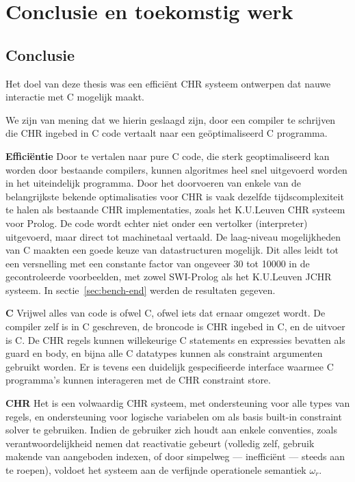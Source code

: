 \chapter{Conclusie en toekomstig werk} \label{chap:concl}

\section{Conclusie} \label{sec:concl}

Het doel van deze thesis was een effici\"ent CHR systeem ontwerpen dat nauwe interactie met C mogelijk maakt.

We zijn van mening dat we hierin geslaagd zijn, door een compiler te schrijven die CHR ingebed in C code vertaalt naar een ge\"optimaliseerd C programma.

{\bf Effici\"entie} Door te vertalen naar pure C code, die sterk geoptimaliseerd kan worden door bestaande compilers, kunnen algoritmes heel snel uitgevoerd worden in het uiteindelijk programma. Door het doorvoeren van enkele van de belangrijkste bekende optimalisaties voor CHR is vaak dezelfde tijdscomplexiteit te halen als bestaande CHR implementaties, zoals het K.U.Leuven CHR systeem voor Prolog. De code wordt echter niet onder een vertolker (interpreter) uitgevoerd, maar direct tot machinetaal vertaald. De laag-niveau mogelijkheden van C maakten een goede keuze van datastructuren mogelijk. Dit alles leidt tot een versnelling met een constante factor van ongeveer 30 tot 10000 in de gecontroleerde voorbeelden, met zowel SWI-Prolog als het K.U.Leuven JCHR systeem. In sectie~\ref{sec:bench-end} werden de resultaten gegeven.

{\bf C} Vrijwel alles van code is ofwel C, ofwel iets dat ernaar omgezet wordt. De compiler zelf is in C geschreven, de broncode is CHR ingebed in C, en de uitvoer is C. De CHR regels kunnen willekeurige C statements en expressies bevatten als guard en body, en bijna alle C datatypes kunnen als constraint argumenten gebruikt worden. Er is tevens een duidelijk gespecifieerde interface waarmee C programma's kunnen interageren met de CHR constraint store.

{\bf CHR} Het is een volwaardig CHR systeem, met ondersteuning voor alle types van regels, en ondersteuning voor logische variabelen om als basis built-in constraint solver te gebruiken. Indien de gebruiker zich houdt aan enkele conventies, zoals verantwoordelijkheid nemen dat reactivatie gebeurt (volledig zelf, gebruik makende van aangeboden indexen, of door simpelweg --- ineffici\"ent --- steeds  aan te roepen), voldoet het systeem aan de verfijnde operationele semantiek $\omega_r$.

